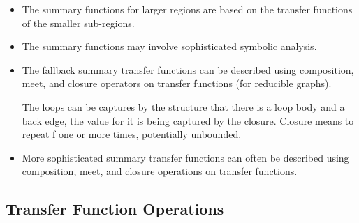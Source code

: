 \begin{figure}[H]
{{        
    }}
    \caption{}


\end{figure}

\begin{itemize}
    \item The summary functions for larger regions are based on the transfer
    functions of the smaller sub-regions.
    \item The summary functions may involve sophisticated symbolic analysis.
    \item The fallback summary transfer functions can be described using
    composition, meet, and closure operators on transfer functions (for 
    reducible graphs).

    The loops can be captures by the structure that there is a loop body and a
    back edge, the value for it is being captured by the closure. Closure
    means to repeat f one or more times, potentially unbounded.
    \item More sophisticated summary transfer functions can often be described
    using composition, meet, and closure operations on transfer functions.
\end{itemize}

\subsection{Transfer Function Operations}

